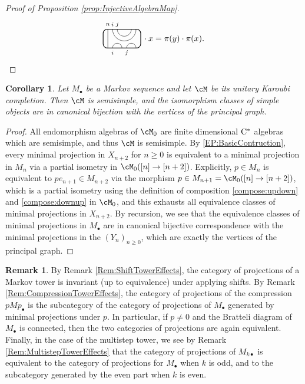 \documentclass[11pt]{article}
\theoremstyle{plain}
\newtheorem{cor}[thm]{Corollary}
\theoremstyle{definition}
\newtheorem{rem}[thm]{Remark}
\newcommand{\Cstar}{\rm{C^*}}
\begin{document}
\begin{proof}[Proof of Proposition \ref{prop:InjectiveAlgebraMap}]
\begin{align*}
 \begin{tikzpicture}[baseline=.3cm]
  \draw (.2,0) -- (.2,.8);
  \node at (.2,1) {\scriptsize{$n$}};
  \draw (.4,0) arc (180:0:.2cm);
  \node at (.4,-.2) {\scriptsize{$i$}};
  \draw (1,0) arc (180:0:.2cm);
  \node at (1,-.2) {\scriptsize{$j$}};
  \draw (.4,.8) arc (-180:0:.5cm);
  \node at (.4,1) {\scriptsize{$i$}};
  \draw (.6,.8) arc (-180:0:.3cm);
  \node at (.6,1) {\scriptsize{$j$}};
  \draw[thick, rounded corners = 5pt] (0,0) rectangle (1.6,.8);
 \end{tikzpicture}
\,\cdot x
=
\pi(y)\cdot \pi(x).
\qedhere
\end{align*}
\end{proof}

\begin{cor}
\label{cor:SemisimpleProjectionCategory}
Let $M_\bullet$ be a Markov sequence and let $\cM$ be its unitary Karoubi completion. %
Then $\cM$ is semisimple, and the isomorphism classes of simple objects are in canonical bijection with the vertices of the principal graph.
\end{cor}
\begin{proof}
All endomorphism algebras of $\cM_0$ are finite dimensional $\Cstar$ algebras which are semisimple, and thus $\cM$ is semisimple. 
By \ref{EP:BasicContruction}, every minimal projection in $X_{n+2}$ for $n\geq 0$ is equivalent to a minimal projection in $M_{n}$ via a partial isometry in $\cM_0([n] \to [n+2])$. 
Explicitly, $p\in M_n$ is equivalent to $p e_{n+1} \in M_{n+2}$ via the morphism $p\in M_{n+1} = \cM_0([n] \to [n+2])$, which is a partial isometry using the definition of composition \ref{compose:updown} and \ref{compose:downup} in $\cM_0$, and this exhausts all equivalence classes of minimal projections in $X_{n+2}$.
By recursion, we see that the equivalence classes of minimal projections in $M_\bullet$ are in canonical bijective correspondence with the minimal projections in the $(Y_n)_{n\geq 0}$, which are exactly the vertices of the principal graph.
\end{proof}


\begin{rem}
\label{rem:HowMCategoryChangesUnderMarkovTowerOperations}
By Remark \ref{Rem:ShiftTowerEffects}, the category of projections of a Markov tower is invariant (up to equivalence) under applying shifts. 
By Remark \ref{Rem:CompressionTowerEffects}, the category of projections of the compression $pMp_\bullet $ is the subcategory of the category of projections of $M_\bullet$ generated by minimal projections under $p$. 
In particular, if $p\neq 0$ and the Bratteli diagram of $M_\bullet$ is connected, then the two categories of projections are again equivalent. 
Finally, in the case of the multistep tower, we see by Remark \ref{Rem:MultistepTowerEffects} that the category of projections of $M_{k\bullet}$ is equivalent to the category of projections for $M_\bullet$ when $k$ is odd, and to the subcategory generated by the even part when $k$ is even.
\end{rem}
\end{document}

